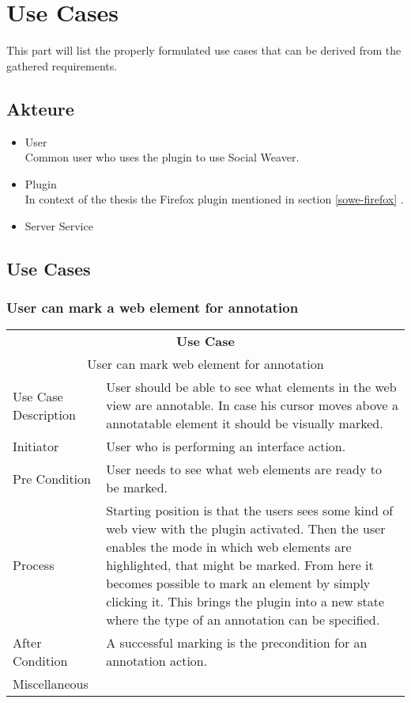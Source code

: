 \section{Use Cases}
This part will list the properly formulated use cases that can be derived from the gathered requirements.

\subsection{Akteure}
\begin{itemize}
\item User \\ 
Common user who uses the plugin to use Social Weaver.

\item Plugin \\ 
In context of the thesis the Firefox plugin mentioned in section \ref{sowe-firefox} .

\item Server Service \\ 
\end{itemize}

\subsection{Use Cases}

\subsubsection[Web Element Marking]{User can mark a web element for annotation}
\begin{tabular}{|l| p{6cm} |}
\hline 
 \multicolumn{2}{|c|}{\textbf{Use Case}} \\ 
 \multicolumn{2}{|c|}{User can mark web element for annotation} \\ 
\hline 
Use Case Description & User should be able to see what elements in the web view are annotable. In case his cursor moves above a annotatable element it should be visually marked. \\ 
\hline 
Initiator & User who is performing an interface action. \\ 
\hline 
Pre Condition & User needs to see what web elements are ready to be marked.\\ 
\hline 
Process & Starting position is that the users sees some kind of web view with the plugin activated. Then the user enables the mode in which web elements are highlighted, that might be marked. From here it becomes possible to mark an element by simply clicking it. This brings the plugin into a new state where the type of an annotation can be specified. \\ 
\hline 
After Condition & A successful marking is the precondition for an annotation action. \\ 
Miscellaneous &  \\ 
\hline 
\end{tabular} 


